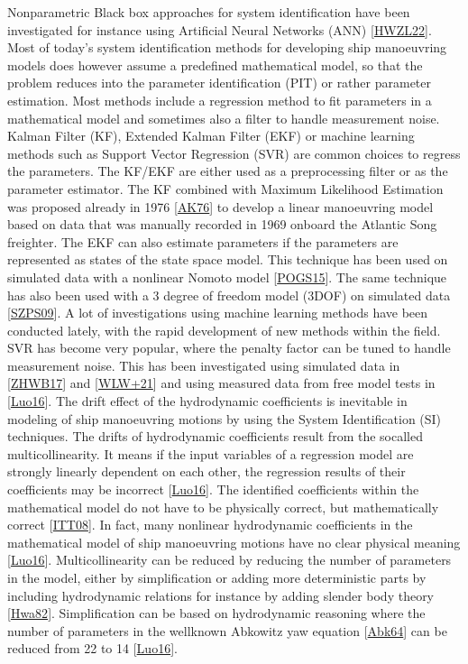 \documentclass[review]{elsarticle}
\begin{document}
\sphinxAtStartPar
Nonparametric Black box approaches for system identification have been investigated for instance using Artificial Neural Networks (ANN) {[}\hyperlink{cite.bibligraphy:id82}{HWZL22}{]}. Most of today’s system identification methods for developing ship manoeuvring models does however assume a pre\sphinxhyphen{}defined mathematical model, so that the problem reduces into the parameter identification (PIT) or rather parameter estimation. Most methods include a regression method to fit parameters in a mathematical model and sometimes also a filter to handle measurement noise.
Kalman Filter (KF), Extended Kalman Filter (EKF) or machine learning methods such as Support Vector Regression (SVR) are common choices to regress the parameters. The KF/EKF are either used as a pre\sphinxhyphen{}processing filter or as the parameter estimator. The KF combined with Maximum Likelihood Estimation was proposed already in 1976 {[}\hyperlink{cite.bibligraphy:id30}{AK76}{]} to develop a linear manoeuvring model based on data that was manually recorded in 1969 onboard the Atlantic Song freighter. The EKF can also estimate parameters if the parameters are represented as states of the state space model. This technique has been used on simulated data with a nonlinear Nomoto model {[}\hyperlink{cite.bibligraphy:id33}{POGS15}{]}. The same technique has also been used with a 3 degree of freedom model (3DOF) on simulated data {[}\hyperlink{cite.bibligraphy:id54}{SZPS09}{]}.
A lot of investigations using machine learning methods have been conducted lately, with the rapid development of new methods within the field. SVR has become very popular, where the penalty factor can be tuned to handle measurement noise. This has been investigated using simulated data in {[}\hyperlink{cite.bibligraphy:id38}{ZHWB17}{]} and {[}\hyperlink{cite.bibligraphy:id47}{WLW+21}{]} and using measured data from free model tests in {[}\hyperlink{cite.bibligraphy:id56}{Luo16}{]}.
The drift effect of the hydrodynamic coefficients is inevitable in modeling of ship manoeuvring motions by using the System Identification (SI) techniques. The drifts of hydrodynamic coefficients result from the so\sphinxhyphen{}called multicollinearity. It means if the input variables of a regression model are strongly linearly dependent on each other, the regression results of their coefficients may be incorrect {[}\hyperlink{cite.bibligraphy:id56}{Luo16}{]}. The identified coefficients within the mathematical model do not have to be physically correct, but mathematically correct {[}\hyperlink{cite.bibligraphy:id75}{ITT08}{]}. In fact, many nonlinear hydrodynamic coefficients in the mathematical model of ship manoeuvring motions have no clear physical meaning {[}\hyperlink{cite.bibligraphy:id56}{Luo16}{]}. Multicollinearity can be reduced by reducing the number of parameters in the model, either by simplification or adding more deterministic parts by including hydrodynamic relations for instance by adding slender body theory {[}\hyperlink{cite.bibligraphy:id80}{Hwa82}{]}. Simplification can be based on hydrodynamic reasoning where the number of parameters in the well\sphinxhyphen{}known Abkowitz yaw equation {[}\hyperlink{cite.bibligraphy:id25}{Abk64}{]} can be reduced from 22 to 14 {[}\hyperlink{cite.bibligraphy:id56}{Luo16}{]}.
\end{document}
